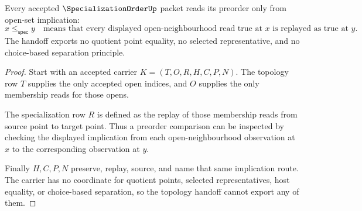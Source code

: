 \begin{theorem}
\label{thm:specialization-order-topology-handoff}
Every accepted $\SpecializationOrderUp$ packet reads its preorder only from open-set implication:
$$
x \leq_{\mathsf{spec}} y
\quad\text{means that every displayed open-neighbourhood read true at }x\text{ is replayed as true at }y.
$$
The handoff exports no quotient point equality, no selected representative, and no choice-based separation principle.
\end{theorem}
\begin{proof}
Start with an accepted carrier $K=(T,O,R,H,C,P,N)$. The topology row $T$ supplies the only accepted open indices, and $O$ supplies the only membership reads for those opens.

The specialization row $R$ is defined as the replay of those membership reads from source point to target point. Thus a preorder comparison can be inspected by checking the displayed implication from each open-neighbourhood observation at $x$ to the corresponding observation at $y$.

Finally $H,C,P,N$ preserve, replay, source, and name that same implication route. The carrier has no coordinate for quotient points, selected representatives, host equality, or choice-based separation, so the topology handoff cannot export any of them.
\end{proof}


\begin{closurestatus}{\SpecializationOrderUp}
  \theoryclosure{\seedClosure}
  \formalstatus{\unformalizedV}
\end{closurestatus}

